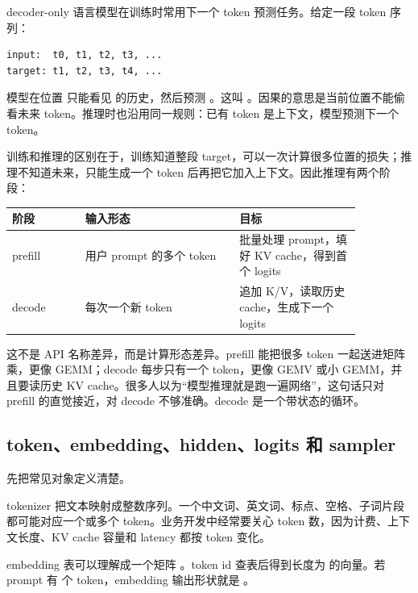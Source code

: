 decoder-only 语言模型在训练时常用下一个 token 预测任务。给定一段 token 序列：

\begin{lstlisting}[numbers=none,caption={训练样本的移位关系}]
input:  t0, t1, t2, t3, ...
target: t1, t2, t3, t4, ...
\end{lstlisting}

模型在位置  只能看见  的历史，然后预测 。这叫 。因果的意思是当前位置不能偷看未来 token。推理时也沿用同一规则：已有 token 是上下文，模型预测下一个 token。

训练和推理的区别在于，训练知道整段 target，可以一次计算很多位置的损失；推理不知道未来，只能生成一个 token 后再把它加入上下文。因此推理有两个阶段：

\begin{center}
\begin{tabular}{p{0.18\linewidth}p{0.38\linewidth}p{0.30\linewidth}}
\toprule
阶段 & 输入形态 & 目标 \\
\midrule
prefill & 用户 prompt 的多个 token & 批量处理 prompt，填好 KV cache，得到首个 logits \\
decode & 每次一个新 token & 追加 K/V，读取历史 cache，生成下一个 logits \\
\bottomrule
\end{tabular}
\end{center}

这不是 API 名称差异，而是计算形态差异。prefill 能把很多 token 一起送进矩阵乘，更像 GEMM；decode 每步只有一个 token，更像 GEMV 或小 GEMM，并且要读历史 KV cache。很多人以为“模型推理就是跑一遍网络”，这句话只对 prefill 的直觉接近，对 decode 不够准确。decode 是一个带状态的循环。

\subsection{token、embedding、hidden、logits 和 sampler}

先把常见对象定义清楚。

 tokenizer 把文本映射成整数序列。一个中文词、英文词、标点、空格、子词片段都可能对应一个或多个 token。业务开发中经常要关心 token 数，因为计费、上下文长度、KV cache 容量和 latency 都按 token 变化。

 embedding 表可以理解成一个矩阵 。token id 查表后得到长度为  的向量。若 prompt 有  个 token，embedding 输出形状就是 \code{[T, H]}。

